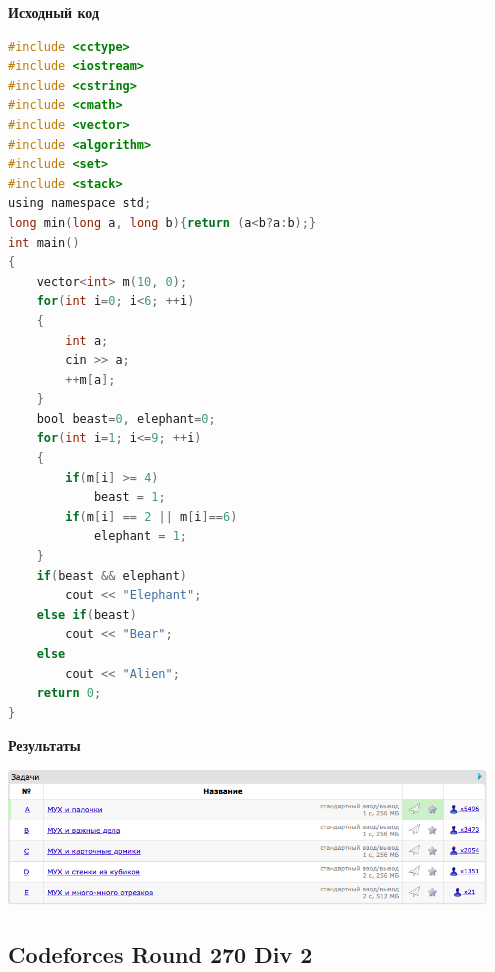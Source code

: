 \documentclass[a4paper,12pt]{article}
\begin{document}
\textbf{{\large Исходный код}}
\begin{lstlisting}[language=C]
#include <cctype>
#include <iostream>
#include <cstring>
#include <cmath>
#include <vector>
#include <algorithm>
#include <set>
#include <stack>
using namespace std;
long min(long a, long b){return (a<b?a:b);}
int main()
{
    vector<int> m(10, 0);
    for(int i=0; i<6; ++i)
    {
        int a;
        cin >> a;
        ++m[a];
    }
    bool beast=0, elephant=0;
    for(int i=1; i<=9; ++i)
    {
        if(m[i] >= 4)
            beast = 1;
        if(m[i] == 2 || m[i]==6)
            elephant = 1;       
    }
    if(beast && elephant)
        cout << "Elephant";
    else if(beast)
        cout << "Bear";
    else
        cout << "Alien";
    return 0;
}
\end{lstlisting}


\textbf{{\large Результаты}} \\
\begin{center}
\includegraphics[width=0.95\textwidth]{C_269/A_C_269_result.png}\\ [1cm]
\end{center}

%
%

\newpage
\subsection{Codeforces Round 270 Div 2}
\end{document}
